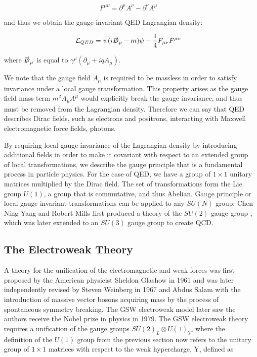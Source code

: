 \begin{equation}
F^{\mu \nu} = \partial^{\mu}A^{\nu} - \partial^{\nu}A^{\mu}
\end{equation}

and thus we obtain the gauge-invariant QED Lagrangian density:

\begin{equation}
\mathcal{L}_{QED} = \bar{\psi}(i \slashed{D}_{\mu} - m) \psi - \frac{1}{4}F_{\mu \nu}F^{\mu \nu}
\end{equation}

where $\slashed{D}_{\mu}$ is equal to $\gamma^{\mu}(\partial_{\mu} + iqA_{\mu})$.

We note that the gauge field $A_{\mu}$ is required to be massless in order to satisfy invariance under a local gauge transformation. This 
property arises as the gauge field mass term $m^2A_{\mu}A^{\mu}$ would explicitly break the gauge invariance, and thus must be removed from the 
Lagrangian density. Therefore we can say that QED describes Dirac fields, such as electrons and positrons, interacting with Maxwell 
electromagnetic force fields, photons.

By requiring local gauge invariance of the Lagrangian density by introducing additional fields in order to make it covariant with respect to an extended group of local transformations, we describe the gauge principle that is a fundamental process in particle physics. For the case of QED, we have a group of $1 \times 1$ unitary matrices multiplied by the Dirac field. The set of transformations form the Lie group $U(1)$, a group that is commutative, and thus Abelian. Gauge principle or local gauge invariant transformations can be applied to any $SU(N)$ group; Chen Ning Yang and Robert Mills first produced a theory of the $SU(2)$ gauge group \cite{PhysRev.96.191}, which was later extended to an $SU(3)$ gauge group to create QCD.  

\subsection{The Electroweak Theory} \label{subsec-ElectroweakTheory}

A theory for the unification of the electromagnetic and weak forces was first proposed by the American physicist Sheldon Glashow in 1961 \cite{Glashow:1961tr} and was later independently revised by Steven Weinberg in 1967 \cite{PhysRevLett.19.1264} and Abdus Salam \cite{Salam:1959zz} with the introduction of massive vector bosons acquiring mass by the process of spontaneous symmetry breaking. The GSW electroweak model later saw the authors receive the Nobel prize in physics in 1979. The GSW electroweak theory requires a unification of the gauge groups $SU(2)_L \otimes U(1)_Y$, where the definition of the $U(1)$ group from the previous section now refers to the unitary group of $1 \times 1$ matrices with respect to the weak hypercharge, Y, defined as 

